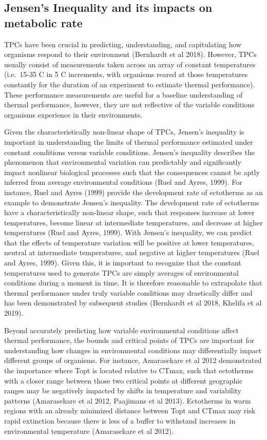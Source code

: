 \documentclass[12pt,twoside]{reedthesis}
\begin{document}
\hypertarget{jensens-inequality-and-its-impacts-on-metabolic-rate}{%
\subsection{Jensen's Inequality and its impacts on metabolic rate}\label{jensens-inequality-and-its-impacts-on-metabolic-rate}}

TPCs have been crucial in predicting, understanding, and capitulating how organisms respond to their environment (Bernhardt et al 2018). However, TPCs usually consist of measurements taken across an array of constant temperatures (i.e.~15-35 C in 5 C increments, with organisms reared at those temperatures constantly for the duration of an experiment to estimate thermal performance). These performance measurements are useful for a baseline understanding of thermal performance, however, they are not reflective of the variable conditions organisms experience in their environments.

Given the characteristically non-linear shape of TPCs, Jensen's inequality is important in understanding the limits of thermal performance estimated under constant conditions versus variable conditions. Jensen's inequality describes the phenomenon that environmental variation can predictably and significantly impact nonlinear biological processes such that the consequences cannot be aptly inferred from average environmental conditions (Ruel and Ayres, 1999). For instance, Ruel and Ayres (1999) provide the development rate of ectotherms as an example to demonstrate Jensen's inequality. The development rate of ectotherms have a characteristically non-linear shape, such that responses increase at lower temperatures, become linear at intermediate temperatures, and decrease at higher temperatures (Ruel and Ayres, 1999). With Jensen's inequality, we can predict that the effects of temperature variation will be positive at lower temperatures, neutral at intermediate temperatures, and negative at higher temperatures (Ruel and Ayres, 1999). Given this, it is important to recognize that the constant temperatures used to generate TPCs are simply averages of environmental conditions during a moment in time. It is therefore reasonable to extrapolate that thermal performance under truly variable conditions may drastically differ and has been demonstrated by subsequent studies (Bernhardt et al 2018, Khelifa et al 2019).

Beyond accurately predicting how variable environmental conditions affect thermal performance, the bounds and critical points of TPCs are important for understanding how changes in environmental conditions may differentially impact different groups of organisms. For instance, Amarasekare et al 2012 demonstrated the importance where Topt is located relative to CTmax, such that ectotherms with a closer range between those two critical points at different geographic ranges may be negatively impacted by shifts in temperature and variability patterns (Amarasekare et al 2012, Paajimans et al 2013). Ectotherms in warm regions with an already minimized distance between Topt and CTmax may risk rapid extinction because there is less of a buffer to withstand increases in environmental temperature (Amarasekare et al 2012).
\end{document}
